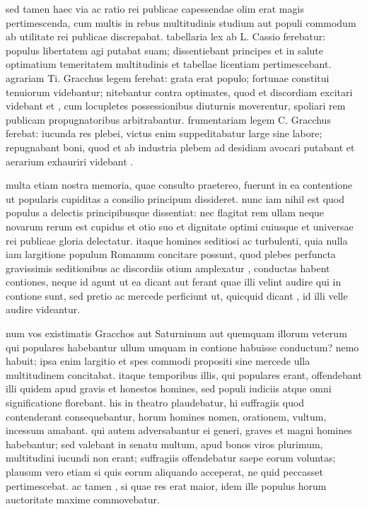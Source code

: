  sed tamen haec via ac ratio rei publicae capessendae olim erat magis pertimescenda, cum multis in rebus multitudinis studium aut populi commodum ab utilitate rei publicae discrepabat. tabellaria lex ab L. Cassio ferebatur: populus libertatem agi putabat suam; dissentiebant principes et in salute optimatium temeritatem multitudinis et tabellae licentiam pertimescebant. agrariam Ti. Gracchus legem ferebat: grata erat populo; fortunae constitui tenuiorum videbantur; nitebantur contra optimates, quod et discordiam excitari videbant et , cum locupletes possessionibus diuturnis moverentur, spoliari rem publicam propugnatoribus arbitrabantur. frumentariam legem C. Gracchus ferebat: iucunda res plebei, victus enim suppeditabatur large sine labore; repugnabant boni, quod et ab industria plebem ad desidiam avocari putabant et aerarium exhauriri videbant .

 multa etiam nostra memoria, quae consulto praetereo, fuerunt in ea contentione ut popularis cupiditas a consilio principum dissideret. nunc iam nihil est quod populus a delectis principibusque dissentiat: nec flagitat rem ullam neque novarum rerum est cupidus et otio suo et dignitate optimi cuiusque et universae rei publicae gloria delectatur. itaque homines seditiosi ac turbulenti, quia nulla iam largitione populum Romanum concitare possunt, quod plebes perfuncta gravissimis seditionibus ac discordiis otium amplexatur , conductas habent contiones, neque id agunt ut ea dicant aut ferant quae illi velint audire qui in contione sunt, sed pretio ac mercede perficiunt ut, quicquid dicant , id illi velle audire videantur.

 num vos existimatis Gracchos aut Saturninum aut quemquam illorum veterum qui populares habebantur ullum umquam in contione habuisse conductum? nemo habuit; ipsa enim largitio et spes commodi propositi sine mercede ulla multitudinem concitabat. itaque temporibus illis, qui populares erant, offendebant illi quidem apud gravis et honestos homines, sed populi iudiciis atque omni significatione florebant. his in theatro plaudebatur, hi suffragiis quod contenderant consequebantur, horum homines nomen, orationem, vultum, incessum amabant. qui autem adversabantur ei generi, graves et magni homines habebantur; sed valebant in senatu multum, apud bonos viros plurimum, multitudini iucundi non erant; suffragiis offendebatur saepe eorum voluntas; plausum vero etiam si quis eorum aliquando acceperat, ne quid peccasset pertimescebat. ac tamen , si quae res erat maior, idem ille populus horum auctoritate maxime commovebatur.

